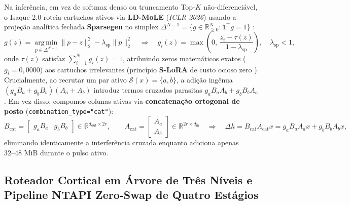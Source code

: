 \documentclass[10pt,a4paper]{article}
\begin{document}
Na infer\^encia, em vez de softmax denso ou truncamento Top-$K$ n\~ao-diferenci\'avel, o Isaque 2.0 roteia cartuchos ativos via \textbf{LD-MoLE} (\textit{ICLR 2026}) \cite{zhuang2026ldmole} usando a proje\c{c}\~ao anal\'itica fechada \textbf{Sparsegen} no simplex $\Delta^{N-1} = \{g \in \mathbb{R}_{\ge 0}^N : \mathbf{1}^\top g = 1\}$ \cite{laha2018sparsegen}:
\begin{equation}
  g(z) = \operatorname*{arg\,min}_{p \in \Delta^{N-1}} \|p - z\|_2^2 - \lambda_{\text{sp}} \|p\|_2^2 \quad \Longrightarrow \quad g_i(z) = \max\!\left(0,\, \frac{z_i - \tau(z)}{1 - \lambda_{\text{sp}}}\right), \quad \lambda_{\text{sp}} < 1,
  \label{eq:sparsegen}
\end{equation}
onde $\tau(z)$ satisfaz $\sum_{i=1}^N g_i(z) = 1$, atribuindo zeros matem\'aticos exatos ($g_i = 0,0000$) aos cartuchos irrelevantes (princ\'ipio \textbf{S-LoRA} de custo ocioso zero \cite{sheng2024slora}). Crucialmente, ao recrutar um par ativo $\mathcal{S}(x) = \{a, b\}$, a adi\c{c}\~ao ing\^enua $(g_a B_a + g_b B_b)(A_a + A_b)$ introduz termos cruzados parasitas $g_a B_a A_b + g_b B_b A_a$. Em vez disso, compomos colunas ativas via \textbf{concatena\c{c}\~ao ortogonal de posto} (\texttt{combination\_\allowbreak{}type="cat"}):
\begin{equation}
  B_{\text{cat}} = \begin{bmatrix} g_a B_a & g_b B_b \end{bmatrix} \in \mathbb{R}^{d_{\text{out}} \times 2r}, \qquad
  A_{\text{cat}} = \begin{bmatrix} A_a \\ A_b \end{bmatrix} \in \mathbb{R}^{2r \times d_{\text{in}}} \quad \Longrightarrow \quad
  \Delta h = B_{\text{cat}} A_{\text{cat}} x = g_a B_a A_a x + g_b B_b A_b x,
  \label{eq:cat}
\end{equation}
eliminando identicamente a interfer\^encia cruzada enquanto adiciona apenas $32\text{--}48\text{ MiB}$ durante o pulso ativo.

\subsection{Roteador Cortical em \'Arvore de Tr\^es N\'iveis e Pipeline NTAPI Zero-Swap de Quatro Est\'agios}
\end{document}
